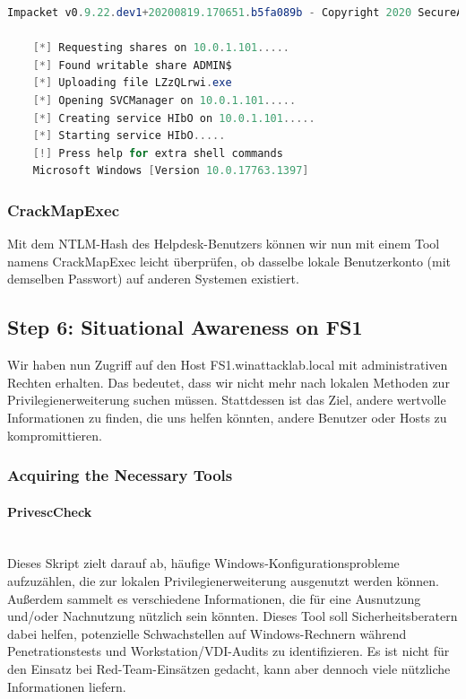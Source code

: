 \begin{lstlisting}[language=PowerShell]
    Impacket v0.9.22.dev1+20200819.170651.b5fa089b - Copyright 2020 SecureAuth Corporation

    [*] Requesting shares on 10.0.1.101.....
    [*] Found writable share ADMIN$
    [*] Uploading file LZzQLrwi.exe
    [*] Opening SVCManager on 10.0.1.101.....
    [*] Creating service HIbO on 10.0.1.101.....
    [*] Starting service HIbO.....
    [!] Press help for extra shell commands
    Microsoft Windows [Version 10.0.17763.1397]
\end{lstlisting}

\subsubsection{CrackMapExec}
Mit dem NTLM-Hash des Helpdesk-Benutzers können wir nun mit einem Tool namens CrackMapExec leicht überprüfen, ob dasselbe lokale Benutzerkonto (mit demselben Passwort) auf anderen Systemen existiert.



\subsection{Step 6: Situational Awareness on FS1}
Wir haben nun Zugriff auf den Host FS1.winattacklab.local mit administrativen Rechten erhalten. Das bedeutet, dass wir nicht mehr nach lokalen Methoden zur Privilegienerweiterung suchen müssen. Stattdessen ist das Ziel, andere wertvolle Informationen zu finden, die uns helfen könnten, andere Benutzer oder Hosts zu kompromittieren.

\subsubsection{Acquiring the Necessary Tools}

\paragraph{PrivescCheck}\mbox{} \\
Dieses Skript zielt darauf ab, häufige Windows-Konfigurationsprobleme aufzuzählen, die zur lokalen Privilegienerweiterung ausgenutzt werden können. Außerdem sammelt es verschiedene Informationen, die für eine Ausnutzung und/oder Nachnutzung nützlich sein könnten.
Dieses Tool soll Sicherheitsberatern dabei helfen, potenzielle Schwachstellen auf Windows-Rechnern während Penetrationstests und Workstation/VDI-Audits zu identifizieren. Es ist nicht für den Einsatz bei Red-Team-Einsätzen gedacht, kann aber dennoch viele nützliche Informationen liefern.

